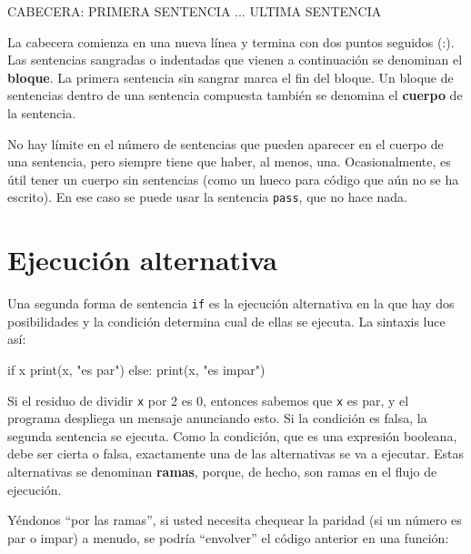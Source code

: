 \beforeverb
\begin{pythoncode}
CABECERA:
  PRIMERA SENTENCIA
  ...
  ULTIMA SENTENCIA
\end{pythoncode}
\afterverb
%

La cabecera comienza en una nueva línea y termina con dos puntos
seguidos (:).  Las sentencias sangradas o indentadas que
vienen a continuación se denominan el {\bf bloque}.
La primera sentencia sin sangrar marca el fin del bloque. Un bloque
de sentencias dentro de una sentencia compuesta también se denomina 
el {\bf cuerpo} de la sentencia.


No hay límite en el número de sentencias que pueden aparecer en el cuerpo
de una sentencia, pero siempre tiene que haber, al menos, una.
Ocasionalmente, es útil tener un cuerpo sin sentencias (como un 
hueco para código que aún no se ha escrito). En ese caso se puede
usar la sentencia  \texttt{pass}, que no hace nada.




\section{Ejecución alternativa}
\label{alternative execution}

Una segunda forma de sentencia \texttt{if} es la ejecución alternativa
en la que hay dos posibilidades y la condición determina cual de ellas
se ejecuta. La sintaxis luce así:

\beforeverb
\begin{pythoncode}
if x %
  print(x, "es par")
else:
  print(x, "es impar")
\end{pythoncode}
\afterverb
%

Si el residuo de dividir \texttt{x} por  2 es 0, entonces sabemos 
que \texttt{x} es par, y el programa despliega un mensaje anunciando esto.
Si la condición es falsa, la segunda sentencia se ejecuta. Como la condición, 
que es una expresión booleana, debe ser cierta o falsa, exactamente una
de las alternativas se va a ejecutar. Estas alternativas se denominan
{\bf ramas}, porque, de hecho, son ramas en el flujo de ejecución.


Yéndonos ``por las ramas'', si usted necesita chequear la paridad
(si un número es par o impar) a menudo, se podría ``envolver''
el código anterior en una función:


